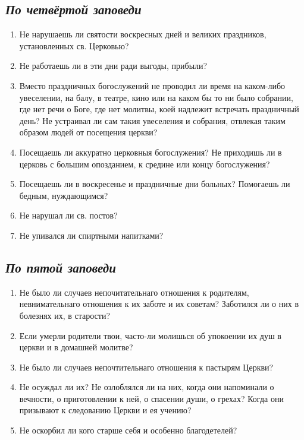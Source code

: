 \subsection*{\itshape По четвёртой заповеди}

\begin{enumerate}

\item Не нарушаешь ли святости воскресных дней и великих праздников, установленных св. Церковью?

\item Не работаешь ли в эти дни ради выгоды, прибыли?

\item Вместо праздничных богослужений не проводил ли время на каком-либо увеселении, на балу, в театре, кино или на каком бы то ни было собрании, где нет речи о Боге, где нет молитвы, коей надлежит встречать праздничный день? Не устраивал ли сам такия увеселения и собрания, отвлекая таким образом людей от посещения церкви?

\item Посещаешь ли аккуратно церковныя богослужения? Не приходишь ли в церковь с большим опозданием, к средине или концу богослужения?

\item Посещаешь ли в воскресенье и праздничные дни больных? Помогаешь ли бедным, нуждающимся?

\item Не нарушал ли св. постов?

\item Не упивался ли спиртными напитками? 
\end{enumerate}

\subsection*{\itshape По пятой заповеди}

\begin{enumerate}

\item Не было ли случаев непочитательнаго отношения к родителям, невнимательнаго отношения к их заботе и их советам? Заботился ли о них в болезнях их, в старости?

\item Если умерли родители твои, часто-ли молишься об упокоении их душ в церкви и в домашней молитве?

\item Не было ли случаев непочтительнаго отношения к пастырям Церкви?

\item Не осуждал ли их? Не озлоблялся ли на них, когда они напоминали о вечности, о приготовлении к ней, о спасении души, о грехах? Когда они призывают к следованию Церкви и ея учению?

\item Не оскорбил ли кого старше себя и особенно благодетелей? 
\end{enumerate}

